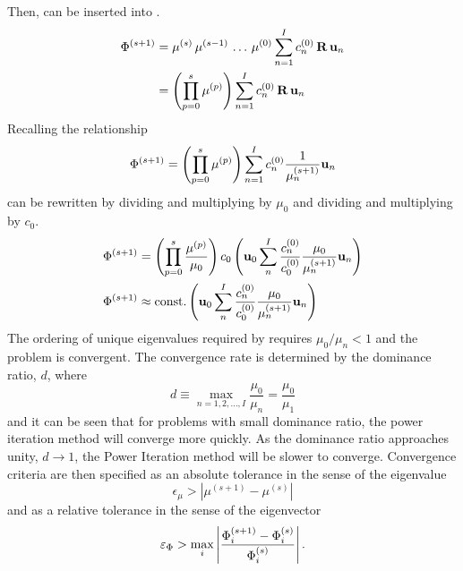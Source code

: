     Then,  can be inserted into
    .
    \begin{align}
      \Phi^{(s+1)} &= \mu^{(s)} \, \mu^{(s-1)} \, \ldots \, 
        \mu^{(0)} \sum_{n=1}^I c_n^{(0)} \, \mathbf{R} \, \mathbf{u}_n \\
      &= \left( \prod_{p=0}^{s} \mu^{(p)} \right) \sum_{n=1}^I c_n^{(0)} \, 
        \mathbf{R} \, \mathbf{u}_n
    \end{align}
    Recalling the relationship 
    \begin{equation}
      \label{eq:phi_expand_above}
      \Phi^{(s+1)} = \left( \prod_{p=0}^s \mu^{(p)} \right) 
        \sum_{n=1}^I c_n^{(0)} \frac{1}{\mu_n^{(s+1)}} \mathbf{u}_n
    \end{equation}
     can be rewritten by dividing and multiplying by
    $\mu_0$ and dividing and multiplying by $c_0$.
    \begin{align}
      \Phi^{(s+1)} &= \left( \prod_{p=0}^s \frac{\mu^{(p)}}{\mu_0} 
        \right) c_0 \left( \mathbf{u}_0 \sum_n^I \frac{c_n^{(0)}}{c_0^{(0)}}
        \frac{\mu_0}{\mu_n^{(s+1)}} \mathbf{u}_n \right) \\
      \label{eq:eigen_phi_converge}
      \Phi^{(s+1)} &\approx \text{const.} \left( 
        \mathbf{u}_0 \sum_n^I \frac{c_n^{(0)}}{c_0^{(0)}}
        \frac{\mu_0}{\mu_n^{(s+1)}} \mathbf{u}_n \right)
    \end{align}
    The ordering of unique eigenvalues required by  
    requires $\mu_0 / \mu_n < 1$ and the problem is convergent. The 
    convergence rate is determined by the dominance ratio, $d$, where
    \begin{equation}
      \label{eq:dominance_ratio}
      d \equiv \max_{n=1,2,\ldots,I} \frac{\mu_0}{\mu_n} =
        \frac{\mu_0}{\mu_1}
    \end{equation}
    and it can be seen that for problems with small dominance ratio, the power
    iteration method will converge more quickly. As the dominance ratio
    approaches unity, $d \rightarrow 1$, the Power Iteration method will be
    slower to converge. Convergence criteria are then specified as an absolute 
    tolerance in the sense of the eigenvalue
    \begin{equation}
      \label{eq:eigenvalue_tol}
      \epsilon_{\mu} > | \mu^{(s+1)} - \mu^{(s)} |
    \end{equation}
    and as a relative tolerance in the sense of the eigenvector
    \begin{equation}
      \label{eq:eigenvector_tol}
      \varepsilon_{\Phi} > \max_i \left| \frac{\Phi_i^{(s+1)} - \Phi_i^{(s)}}
        {\Phi_i^{(s)}}\right| .
    \end{equation}

